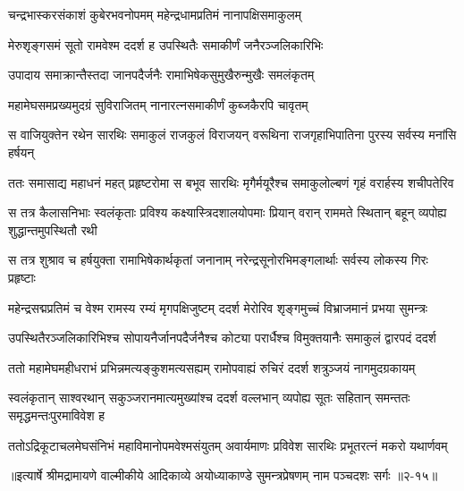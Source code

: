 \twolineshloka
{चन्द्रभास्करसंकाशं कुबेरभवनोपमम्}
{महेन्द्रधामप्रतिमं नानापक्षिसमाकुलम्} %

\twolineshloka
{मेरुशृङ्गसमं सूतो रामवेश्म ददर्श ह}
{उपस्थितैः समाकीर्णं जनैरञ्जलिकारिभिः} %

\twolineshloka
{उपादाय समाक्रान्तैस्तदा जानपदैर्जनैः}
{रामाभिषेकसुमुखैरुन्मुखैः समलंकृतम्} %

\twolineshloka
{महामेघसमप्रख्यमुदग्रं सुविराजितम्}
{नानारत्नसमाकीर्णं कुब्जकैरपि चावृतम्} %

\twolineshloka
{स वाजियुक्तेन रथेन सारथिः समाकुलं राजकुलं विराजयन्}
{वरूथिना राजगृहाभिपातिना पुरस्य सर्वस्य मनांसि हर्षयन्} %

\twolineshloka
{ततः समासाद्य महाधनं महत् प्रहृष्टरोमा स बभूव सारथिः}
{मृगैर्मयूरैश्च समाकुलोल्बणं गृहं वरार्हस्य शचीपतेरिव} %

\twolineshloka
{स तत्र कैलासनिभाः स्वलंकृताः प्रविश्य कक्ष्यास्त्रिदशालयोपमाः}
{प्रियान् वरान् राममते स्थितान् बहून् व्यपोह्य शुद्धान्तमुपस्थितौ रथी} %

\twolineshloka
{स तत्र शुश्राव च हर्षयुक्ता रामाभिषेकार्थकृतां जनानाम्}
{नरेन्द्रसूनोरभिमङ्गलार्थाः सर्वस्य लोकस्य गिरः प्रहृष्टाः} %

\twolineshloka
{महेन्द्रसद्मप्रतिमं च वेश्म रामस्य रम्यं मृगपक्षिजुष्टम्}
{ददर्श मेरोरिव शृङ्गमुच्चं विभ्राजमानं प्रभया सुमन्त्रः} %

\twolineshloka
{उपस्थितैरञ्जलिकारिभिश्च सोपायनैर्जानपदैर्जनैश्च}
{कोट्या परार्धैश्च विमुक्तयानैः समाकुलं द्वारपदं ददर्श} %

\twolineshloka
{ततो महामेघमहीधराभं प्रभिन्नमत्यङ्कुशमत्यसह्यम्}
{रामोपवाह्यं रुचिरं ददर्श शत्रुञ्जयं नागमुदग्रकायम्} %

\twolineshloka
{स्वलंकृतान् साश्वरथान् सकुञ्जरानमात्यमुख्यांश्च ददर्श वल्लभान्}
{व्यपोह्य सूतः सहितान् समन्ततः समृद्धमन्तःपुरमाविवेश ह} %

\twolineshloka
{ततोऽद्रिकूटाचलमेघसंनिभं महाविमानोपमवेश्मसंयुतम्}
{अवार्यमाणः प्रविवेश सारथिः प्रभूतरत्नं मकरो यथार्णवम्} %


॥इत्यार्षे श्रीमद्रामायणे वाल्मीकीये आदिकाव्ये अयोध्याकाण्डे सुमन्त्रप्रेषणम् नाम पञ्चदशः सर्गः ॥२-१५॥
